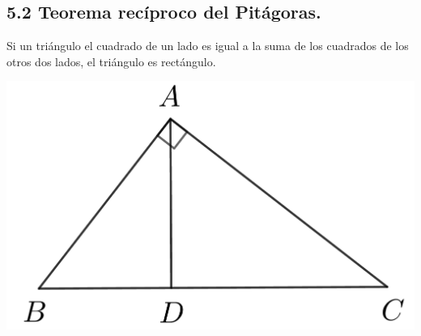 \documentclass[12pt,a4paper]{article}
\begin{document}
\subsection*{5.2 Teorema recíproco del Pitágoras.}
Si un triángulo el cuadrado de un lado es igual a la suma de los cuadrados de los otros dos lados, el triángulo es rectángulo.
\begin{center}
\includegraphics[scale=0.8]{pitagoras.png} 
\end{center}
\end{document}
